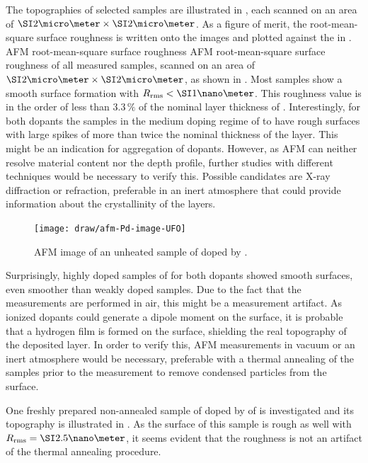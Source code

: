 The topographies of selected samples are illustrated in , each scanned on an area of $\um{2}\times\um{2}$. As a figure of merit, the root-mean-square surface roughness \rms is written onto the images and plotted against the \CLong in .
%
%
{AFM root-mean-square surface roughness \rms}
{AFM root-mean-square surface roughness \rms of all measured samples, scanned on an area of $\um{2}\times\um{2}$, as shown in .
}
%
Most samples show a smooth surface formation with $\rms<\nm{1}$. This roughness value is in the order of less than $3.3\,\%$ of the nominal layer thickness of . Interestingly, for both dopants the samples in the medium doping regime of \C[0.020] to  have rough surfaces with large spikes of more than twice the nominal thickness of the layer. This might be an indication for aggregation of dopants. However, as AFM can neither resolve material content nor the depth profile, further studies with different techniques would be necessary to verify this. Possible candidates are X-ray diffraction or refraction, preferable in an inert atmosphere that could provide information about the crystallinity of the layers.

%
\begin{figure}%
{%
\vspace*{-1.85em}%
\texttt{[image: draw/afm-Pd-image-UFO]}%
}%
\caption[AFM image of an unheated sample]%
{AFM image of an unheated sample of \CS doped by \C[0.024] \WPd.}%
\label{fig:afm-Pd-image-UFO}%
\end{figure}%
%
Surprisingly, highly doped samples of  for both dopants showed smooth surfaces, even smoother than weakly doped samples. Due to the fact that the measurements are performed in air, this might be a measurement artifact.
As ionized dopants could generate a dipole moment on the surface, it is probable that a hydrogen film is formed on the surface, shielding the real topography of the deposited layer. In order to verify this, AFM measurements in vacuum or an inert atmosphere would be necessary, preferable with a thermal annealing of the samples prior to the measurement to remove condensed particles from the surface.

One freshly prepared non-annealed sample of \CS doped by \C[0.024] of \WPd is investigated and its topography is illustrated in . As the surface of this sample is rough as well with $\rms=\nm{2.5}$, it seems evident that the roughness is not an artifact of the thermal annealing procedure.

